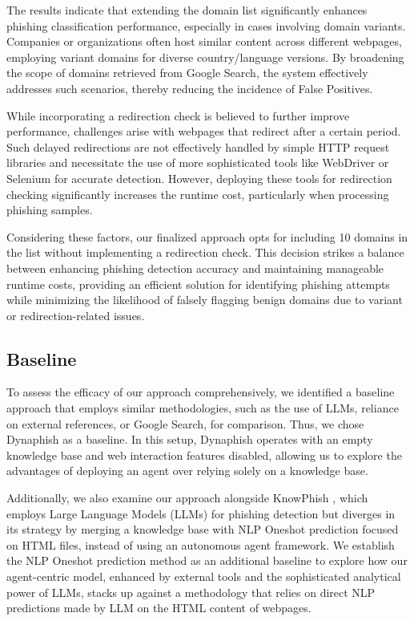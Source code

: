 The results indicate that extending the domain list significantly enhances phishing classification performance, especially in cases involving domain variants. Companies or organizations often host similar content across different webpages, employing variant domains for diverse country/language versions. By broadening the scope of domains retrieved from Google Search, the system effectively addresses such scenarios, thereby reducing the incidence of False Positives.

While incorporating a redirection check is believed to further improve performance, challenges arise with webpages that redirect after a certain period. Such delayed redirections are not effectively handled by simple HTTP request libraries and necessitate the use of more sophisticated tools like WebDriver or Selenium for accurate detection. However, deploying these tools for redirection checking significantly increases the runtime cost, particularly when processing phishing samples.

Considering these factors, our finalized approach opts for including 10 domains in the list without implementing a redirection check. This decision strikes a balance between enhancing phishing detection accuracy and maintaining manageable runtime costs, providing an efficient solution for identifying phishing attempts while minimizing the likelihood of falsely flagging benign domains due to variant or redirection-related issues.

\subsection{Baseline} 

To assess the efficacy of our approach comprehensively, we identified a baseline approach that employs similar methodologies, such as the use of LLMs, reliance on external references, or Google Search, for comparison. Thus, we chose Dynaphish as a baseline. In this setup, Dynaphish \cite{liu2023knowledge} operates with an empty knowledge base and web interaction features disabled, allowing us to explore the advantages of deploying an agent over relying solely on a knowledge base.

Additionally, we also examine our approach alongside KnowPhish \cite{li2024knowphish}, which employs Large Language Models (LLMs) for phishing detection but diverges in its strategy by merging a knowledge base with NLP Oneshot prediction focused on HTML files, instead of using an autonomous agent framework. We establish the NLP Oneshot prediction method as an additional baseline to explore how our agent-centric model, enhanced by external tools and the sophisticated analytical power of LLMs, stacks up against a methodology that relies on direct NLP predictions made by LLM on the HTML content of webpages.

